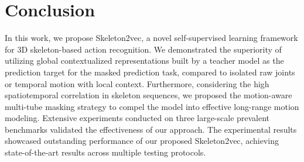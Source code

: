 \vspace{-5pt}
\section{Conclusion}
\vspace{-5pt}
In this work, we propose Skeleton2vec, a novel self-supervised learning framework
for 3D skeleton-based action recognition. We demonstrated the superiority of utilizing
global contextualized representations built by a teacher model as the prediction target
for the masked prediction task, compared to isolated raw joints or temporal motion with
local context. Furthermore, considering the high spatiotemporal correlation in skeleton
sequences, we proposed the motion-aware multi-tube masking strategy to compel the model into
effective long-range motion modeling. Extensive experiments conducted on three large-scale
prevalent benchmarks validated the effectiveness of our approach. The experimental results
showcased outstanding performance of our proposed Skeleton2vec,
achieving state-of-the-art results across multiple testing protocols.